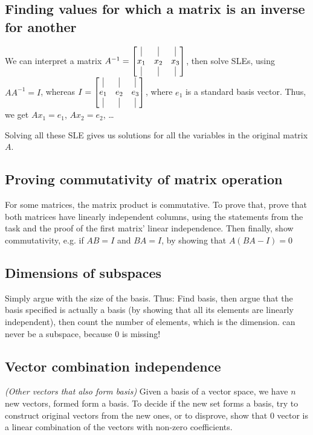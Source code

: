 \newsectionNoPB
\subsection{Finding values for which a matrix is an inverse for another}
We can interpret a matrix $A^{-1} = \begin{bmatrix}
        \vline & \vline & \vline \\
        x_1    & x_2    & x_3    \\
        \vline & \vline & \vline
    \end{bmatrix}$, then solve SLEs, using $AA^{-1} = I$, whereas $I = \begin{bmatrix}
        \vline & \vline & \vline \\
        e_1    & e_2    & e_3    \\
        \vline & \vline & \vline
    \end{bmatrix}$, where $e_1$ is a standard basis vector. Thus, we get $Ax_1 = e_1$, $Ax_2 = e_2$, \dots

Solving all these SLE gives us solutions for all the variables in the original matrix $A$.


\vspace{-0.5pc}
\subsection{Proving commutativity of matrix operation}
For some matrices, the matrix product is commutative. To prove that, prove that both matrices have linearly independent columns, using the statements from the task and the proof of the first matrix' linear independence. Then finally, show commutativity, e.g. if $AB = I$ and $BA = I$, by showing that $A(BA - I) = 0$


\vspace{-0.5pc}
\subsection{Dimensions of subspaces}
Simply argue with the size of the basis. Thus: Find basis, then argue that the basis specified is actually a basis (by showing that all its elements are linearly independent), then count the number of elements, which is the dimension.  can never be a subspace, because $0$ is missing!


\vspace{-0.5pc}
\subsection{Vector combination independence}
\textit{(Other vectors that also form basis)}
Given a basis of a vector space, we have $n$ new vectors, formed form a basis.
To decide if the new set forms a basis, try to construct original vectors from the new ones, or to disprove, show that $0$ vector is a linear combination of the vectors with non-zero coefficients.

